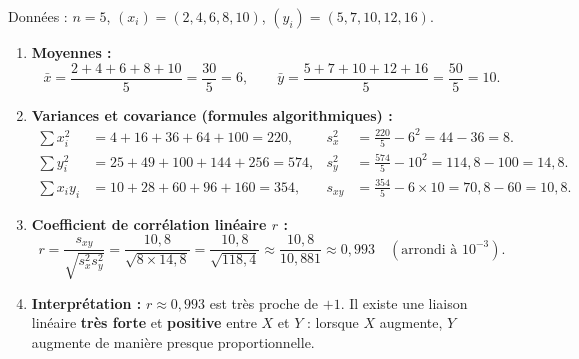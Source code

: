 \documentclass[11pt]{article}
\begin{document}
\begin{corrige}
Données : $n=5$, $(x_i) = (2, 4, 6, 8, 10)$, $(y_i) = (5, 7, 10, 12, 16)$.

\begin{enumerate}
\item \textbf{Moyennes :}
\[
\bar{x} = \frac{2+4+6+8+10}{5} = \frac{30}{5} = 6,
\qquad
\bar{y} = \frac{5+7+10+12+16}{5} = \frac{50}{5} = 10.
\]

\item \textbf{Variances et covariance (formules algorithmiques) :}
\[
\begin{aligned}
\sum x_i^2 &= 4 + 16 + 36 + 64 + 100 = 220, &
s_x^2 &= \frac{220}{5} - 6^2 = 44 - 36 = 8. \\[4pt]
\sum y_i^2 &= 25 + 49 + 100 + 144 + 256 = 574, &
s_y^2 &= \frac{574}{5} - 10^2 = 114,8 - 100 = 14,8. \\[4pt]
\sum x_i y_i &= 10 + 28 + 60 + 96 + 160 = 354, &
s_{xy} &= \frac{354}{5} - 6 \times 10 = 70,8 - 60 = 10,8.
\end{aligned}
\]

\item \textbf{Coefficient de corrélation linéaire $r$ :}
\[
r = \frac{s_{xy}}{\sqrt{s_x^2 s_y^2}} = \frac{10,8}{\sqrt{8 \times 14,8}} = \frac{10,8}{\sqrt{118,4}} \approx \frac{10,8}{10,881} \approx 0,993 \quad (\text{arrondi à } 10^{-3}).
\]

\item \textbf{Interprétation :} $r \approx 0,993$ est très proche de $+1$. Il existe une liaison linéaire \textbf{très forte} et \textbf{positive} entre $X$ et $Y$ : lorsque $X$ augmente, $Y$ augmente de manière presque proportionnelle.
\end{enumerate}
\end{corrige}
\end{document}
